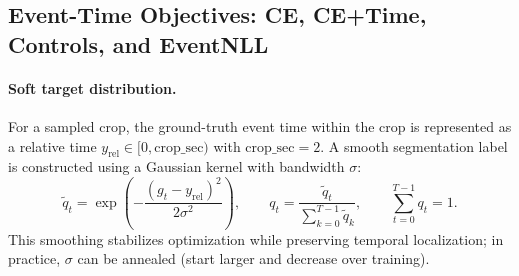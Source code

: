 \documentclass[12pt]{article}
\begin{document}
\subsection{Event-Time Objectives: CE, CE+Time, Controls, and EventNLL}

\paragraph{Soft target distribution.}
For a sampled crop, the ground-truth event time within the crop is represented as a relative time
$y_{\mathrm{rel}}\in[0,\mathrm{crop\_sec})$ with $\mathrm{crop\_sec}=2$.
A smooth segmentation label is constructed using a Gaussian kernel with bandwidth $\sigma$:
\begin{equation}
\label{eq:rt_soft_target}
\tilde q_t=\exp\left(-\frac{(g_t-y_{\mathrm{rel}})^2}{2\sigma^2}\right),\qquad
q_t=\frac{\tilde q_t}{\sum_{k=0}^{T-1}\tilde q_k},\qquad
\sum_{t=0}^{T-1} q_t=1.
\end{equation}
This smoothing stabilizes optimization while preserving temporal localization; in practice, $\sigma$ can be annealed
(start larger and decrease over training).
\end{document}
